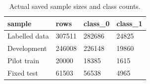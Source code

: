 \begin{table}[htbp]
\centering
\small
\caption{Actual saved sample sizes and class counts.}
\label{tab:sample-balance}
\begin{tabular}{llll}
\toprule
sample & rows & class\_0 & class\_1 \\
\midrule
Labelled data & 307511 & 282686 & 24825 \\
Development & 246008 & 226148 & 19860 \\
Pilot train & 20000 & 18385 & 1615 \\
Fixed test & 61503 & 56538 & 4965 \\
\bottomrule
\end{tabular}
\end{table}
